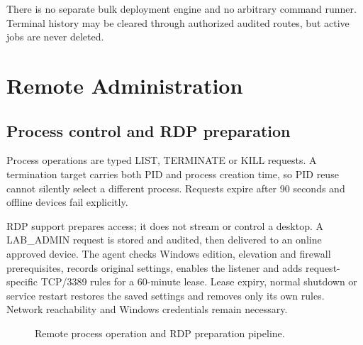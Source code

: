 \documentclass[12pt,a4paper]{report}
\begin{document}
There is no separate bulk deployment engine and no arbitrary command runner.
Terminal history may be cleared through authorized audited routes, but active
jobs are never deleted.

\section{Remote Administration}

\subsection{Process control and RDP preparation}
Process operations are typed LIST, TERMINATE or KILL requests. A termination
target carries both PID and process creation time, so PID reuse cannot silently
select a different process. Requests expire after 90 seconds and offline
devices fail explicitly.

RDP support prepares access; it does not stream or control a desktop. A
LAB\_ADMIN request is stored and audited, then delivered to an online approved
device. The agent checks Windows edition, elevation and firewall prerequisites,
records original settings, enables the listener and adds request-specific
TCP/3389 rules for a 60-minute lease. Lease expiry, normal shutdown or service
restart restores the saved settings and removes only its own rules. Network
reachability and Windows credentials remain necessary.

\begin{figure}[H]
\centering
{}
\caption{Remote process operation and RDP preparation pipeline.}
\label{fig:remote-operation-flow}
\end{figure}
\end{document}
